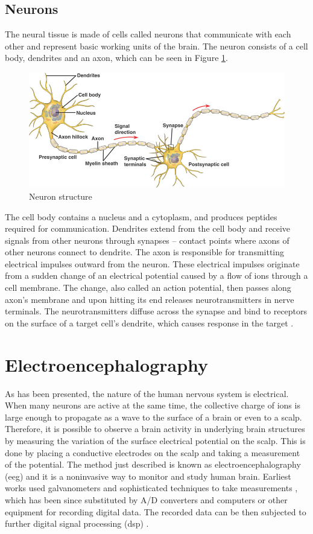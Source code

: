 \subsection{Neurons}
The neural tissue is made of cells called neurons that communicate with each
other and represent basic working units of the brain.
The neuron consists of a cell body, dendrites and an axon, which can be seen in Figure \ref{fig:neuron}.
\begin{figure}[htb]
	\centering
	\includegraphics[width=0.8\linewidth]{fig/neuron2.jpg}
	\caption[Caption for LOF]{Neuron structure\protect\footnotemark}
	\label{fig:neuron}
\end{figure}
The cell body contains a nucleus and a cytoplasm, and
produces peptides required for communication. Dendrites extend from the cell body and
receive signals from other neurons through synapses -- contact points where
axons of other neurons connect to dendrite. The axon is responsible for transmitting
electrical impulses outward from the neuron. These electrical impulses originate
from a sudden change of an electrical potential caused by a flow of ions through a cell
membrane. The change, also called an action potential, then passes along axon's
membrane and upon hitting its end releases neurotransmitters in nerve terminals.
The neurotransmitters diffuse across the synapse and bind to receptors on the surface
of a target cell's dendrite, which causes response in the target \cite{brainFacts}.

\section{Electroencephalography}
As has been presented, the nature of the human nervous system is electrical. When many neurons are active at the same time, the collective charge of ions is large enough to propagate as a wave to the surface of a brain or even to a scalp. Therefore, it is possible to observe a brain activity in underlying brain structures by measuring the variation of the surface electrical potential on the scalp. This is done by placing a conductive electrodes on the scalp and taking a measurement of the potential. The method just described is known as electroencephalography (\gls{eeg}) and it is a noninvasive way to monitor and study human brain. Earliest works used galvanometers and sophisticated techniques to take measurements \cite{eegHistory}, which has been since substituted by A/D converters and computers or other equipment for recording digital data. The recorded data can be then subjected to further digital signal processing (\gls{dsp}) \cite{eegClass}.

